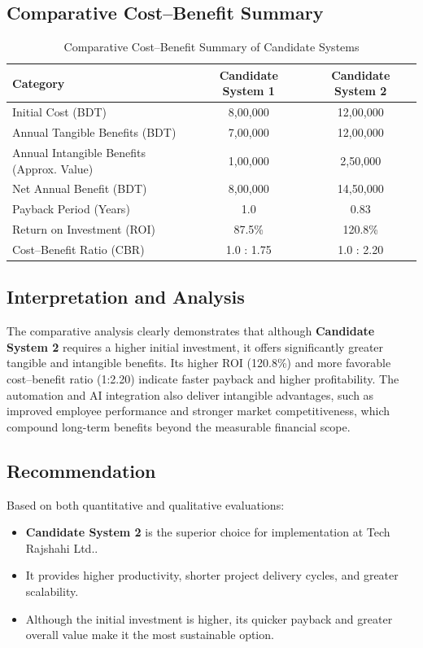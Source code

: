 \documentclass[12pt,a4paper]{article}
\newcommand{\company}[1]{#1}
\begin{document}
\subsection{Comparative Cost–Benefit Summary}

\begin{table}[H]
\centering
\renewcommand{\arraystretch}{1.3}
\begin{tabular}{|p{6cm}|c|c|}
\hline
\rowcolor{tableheader}
\textcolor{headertext}{\textbf{Category}} & 
\textcolor{headertext}{\textbf{Candidate System 1}} & 
\textcolor{headertext}{\textbf{Candidate System 2}} \\ \hline
Initial Cost (BDT) & 8,00,000 & 12,00,000 \\ \hline
Annual Tangible Benefits (BDT) & 7,00,000 & 12,00,000 \\ \hline
Annual Intangible Benefits (Approx. Value) & 1,00,000 & 2,50,000 \\ \hline
Net Annual Benefit (BDT) & 8,00,000 & 14,50,000 \\ \hline
Payback Period (Years) & 1.0 & 0.83 \\ \hline
Return on Investment (ROI) & 87.5\% & 120.8\% \\ \hline
Cost–Benefit Ratio (CBR) & 1.0 : 1.75 & 1.0 : 2.20 \\ \hline
\end{tabular}
\caption{Comparative Cost–Benefit Summary of Candidate Systems}
\end{table}

\subsection{Interpretation and Analysis}
The comparative analysis clearly demonstrates that although \textbf{Candidate System 2} requires a higher initial investment, it offers significantly greater tangible and intangible benefits.  
Its higher ROI (120.8\%) and more favorable cost–benefit ratio (1:2.20) indicate faster payback and higher profitability.  
The automation and AI integration also deliver intangible advantages, such as improved employee performance and stronger market competitiveness, which compound long-term benefits beyond the measurable financial scope.

\newpage
\subsection{Recommendation}
Based on both quantitative and qualitative evaluations:
\begin{itemize}
    \item \textbf{Candidate System 2} is the superior choice for implementation at \company{Tech Rajshahi Ltd.}.
    \item It provides higher productivity, shorter project delivery cycles, and greater scalability.
    \item Although the initial investment is higher, its quicker payback and greater overall value make it the most sustainable option.
\end{itemize}
\end{document}
